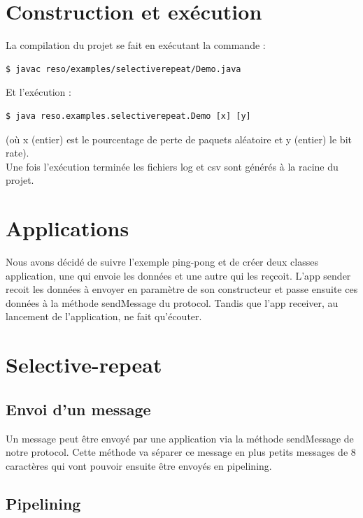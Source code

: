 \documentclass{article}
\begin{document}
\tableofcontents
\newpage


\section{Construction et exécution}

La compilation du projet se fait en exécutant la commande :
\begin{verbatim}
$ javac reso/examples/selectiverepeat/Demo.java
\end{verbatim}
Et l'exécution : 
\begin{verbatim}
$ java reso.examples.selectiverepeat.Demo [x] [y]
\end{verbatim}
(où x (entier) est le pourcentage de perte de paquets aléatoire et y (entier) le bit rate).\\
Une fois l'exécution terminée les fichiers log et csv sont générés à la racine du projet.

\section{Applications}

Nous avons décidé de suivre l'exemple ping-pong et de créer deux classes application, une qui envoie les données et une autre qui les reçcoit.
L'app sender recoit les données à envoyer en paramètre de son constructeur et passe ensuite ces données à la méthode sendMessage du protocol. 
Tandis que l'app receiver, au lancement de l'application, ne fait qu'écouter.

\section{Selective-repeat}

\subsection{Envoi d'un message}

Un message peut être envoyé par une application via la méthode sendMessage de notre protocol. 
Cette méthode va séparer ce message en plus petits messages de 8 caractères qui vont pouvoir ensuite être envoyés en pipelining.

\subsection{Pipelining}
\end{document}
